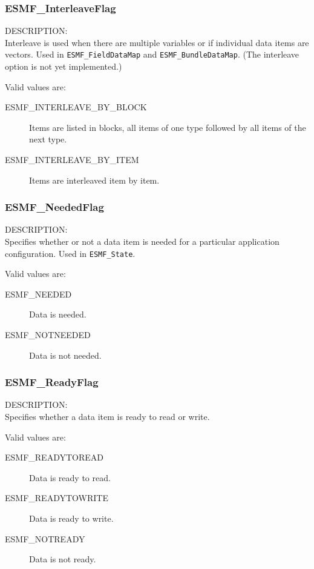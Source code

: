 \subsubsection{ESMF\_InterleaveFlag}
\label{opt:interleave}
{\sf DESCRIPTION:\\}
Interleave is used when there are multiple variables or
if individual data items are vectors.  Used in {\tt ESMF\_FieldDataMap}
and {\tt ESMF\_BundleDataMap}.
(The interleave option is not yet implemented.)


Valid values are:
\begin{description}
   \item [ESMF\_INTERLEAVE\_BY\_BLOCK]
         Items are listed in blocks, all items of one type followed
         by all items of the next type.
   \item [ESMF\_INTERLEAVE\_BY\_ITEM]
         Items are interleaved item by item.
\end{description}


\subsubsection{ESMF\_NeededFlag}
\label{opt:neededflag}
{\sf DESCRIPTION:\\}
Specifies whether or not a data item is needed for a 
particular application configuration.  Used in {\tt ESMF\_State}.

Valid values are:
\begin{description}
   \item [ESMF\_NEEDED] 
         Data is needed.
   \item [ESMF\_NOTNEEDED]
         Data is not needed.
\end{description}

\subsubsection{ESMF\_ReadyFlag}
\label{opt:readyflag}
{\sf DESCRIPTION:\\}
Specifies whether a data item is ready to read or write.

Valid values are:
\begin{description}
   \item [ESMF\_READYTOREAD] 
         Data is ready to read.
   \item [ESMF\_READYTOWRITE]
         Data is ready to write.
   \item [ESMF\_NOTREADY]
         Data is not ready.
\end{description}

